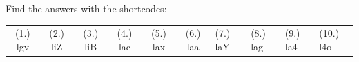 \begin{eocexercises}{}
\begin{enumerate}[itemsep=6pt, label=\textbf{\arabic*}.]
  \end{enumerate}
\practiceinfo
\par {}Find the answers with the shortcodes:
\par \begin{tabular}[h]{cccccc}
(1.) lgv  &  (2.) liZ  &  (3.) liB  &  (4.) lac  &  (5.) lax  &  (6.) laa  &  (7.) laY  &  (8.) lag  &  (9.) la4  &  (10.) l4o  & \end{tabular}
\end{eocexercises}
